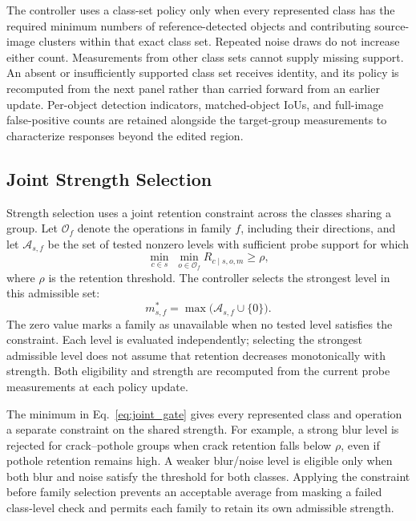 \documentclass[conference]{IEEEtran}
\begin{document}
The controller uses a class-set policy only when every represented class has the required minimum numbers of reference-detected objects and contributing source-image clusters within that exact class set. Repeated noise draws do not increase either count. Measurements from other class sets cannot supply missing support. An absent or insufficiently supported class set receives identity, and its policy is recomputed from the next panel rather than carried forward from an earlier update. Per-object detection indicators, matched-object IoUs, and full-image false-positive counts are retained alongside the target-group measurements to characterize responses beyond the edited region.

\subsection{Joint Strength Selection}
\label{sec:method_strength}
Strength selection uses a joint retention constraint across the classes sharing a group. Let $\mathcal{O}_f$ denote the operations in family $f$, including their directions, and let $\mathcal{A}_{s,f}$ be the set of tested nonzero levels with sufficient probe support for which
\begin{equation}
 \min_{c\in s}\;\min_{o\in\mathcal{O}_f}
 R_{c\mid s,o,m}\geq\rho,
 \label{eq:joint_gate}
\end{equation}
where $\rho$ is the retention threshold. The controller selects the strongest level in this admissible set:
\begin{equation}
 m^*_{s,f}=\max\bigl(\mathcal{A}_{s,f}\cup\{0\}\bigr).
 \label{eq:selected_strength}
\end{equation}
The zero value marks a family as unavailable when no tested level satisfies the constraint. Each level is evaluated independently; selecting the strongest admissible level does not assume that retention decreases monotonically with strength. Both eligibility and strength are recomputed from the current probe measurements at each policy update.

The minimum in Eq.~\ref{eq:joint_gate} gives every represented class and operation a separate constraint on the shared strength. For example, a strong blur level is rejected for crack--pothole groups when crack retention falls below $\rho$, even if pothole retention remains high. A weaker blur/noise level is eligible only when both blur and noise satisfy the threshold for both classes. Applying the constraint before family selection prevents an acceptable average from masking a failed class-level check and permits each family to retain its own admissible strength.
\end{document}
